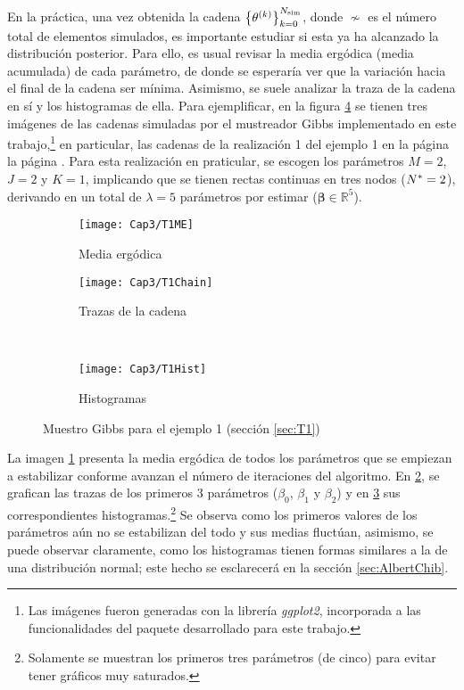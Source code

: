 \documentclass[../Main/Main.tex]{subfiles}
\begin{document}
En la práctica, una vez obtenida la cadena $\left\{\theta^{(k)}\right\}_{k=0}^{N_{\text{sim}}}$, donde $\nsim$ es el número total de elementos simulados, es importante estudiar si esta ya ha alcanzado la distribución posterior. Para ello, es usual revisar la media ergódica (media acumulada) de cada parámetro, de donde se esperaría ver que la variación hacia el final de la cadena ser mínima. Asimismo, se suele analizar la traza de la cadena en sí y los histogramas de ella. Para ejemplificar, en la figura \ref{fig:GibbsSamplerSimulado} se tienen tres imágenes de las cadenas simuladas por el mustreador Gibbs implementado en este trabajo,\footnote{Las imágenes fueron generadas con la librería \textit{ggplot2}, incorporada a las funcionalidades del paquete desarrollado para este trabajo.} en particular, las cadenas de la realización 1 del ejemplo 1 en la página la página \pageref{fig:T1M1}. Para esta realización en praticular, se escogen los parámetros $M = 2$, $J = 2$ y $K = 1$, implicando que se tienen rectas continuas en tres nodos ($N^* = 2$), derivando en un total de $\lambda = 5$ parámetros por estimar ($\bm{\beta}\in\mathbb{R}^5$). 
\begin{figure}[h]
    \centering
    \begin{subfigure}[b]{0.45\textwidth}
        \texttt{[image: Cap3/T1ME]}
        \caption{Media ergódica}
        \label{img:MedErg}
    \end{subfigure}
	\quad
    \begin{subfigure}[b]{0.45\textwidth}
        \texttt{[image: Cap3/T1Chain]}
        \caption{Trazas de la cadena}
        \label{img:GibbsChain}
    \end{subfigure}
	\\
    \centering
    \begin{subfigure}[b]{0.45\textwidth}
        \texttt{[image: Cap3/T1Hist]}
        \caption{Histogramas}
        \label{img:GibbsHist}
    \end{subfigure}
    \caption{Muestro Gibbs para el ejemplo 1 (sección \ref{sec:T1})}\label{fig:GibbsSamplerSimulado}
\end{figure}
La imagen \ref{img:MedErg} presenta la media ergódica de todos los parámetros que se empiezan a estabilizar conforme avanzan el número de iteraciones del algoritmo. En \ref{img:GibbsChain}, se grafican las trazas de los primeros 3 parámetros ($\beta_0$, $\beta_1$ y $\beta_2$) y en \ref{img:GibbsHist} sus correspondientes histogramas.\footnote{Solamente se muestran los primeros tres parámetros (de cinco) para evitar tener gráficos muy saturados.} Se observa como los primeros valores de los parámetros aún no se estabilizan del todo y sus medias fluctúan, asimismo, se puede observar claramente, como los histogramas tienen formas similares a la de una distribución normal; este hecho se esclarecerá en la sección \ref{sec:AlbertChib}. 
\end{document}
